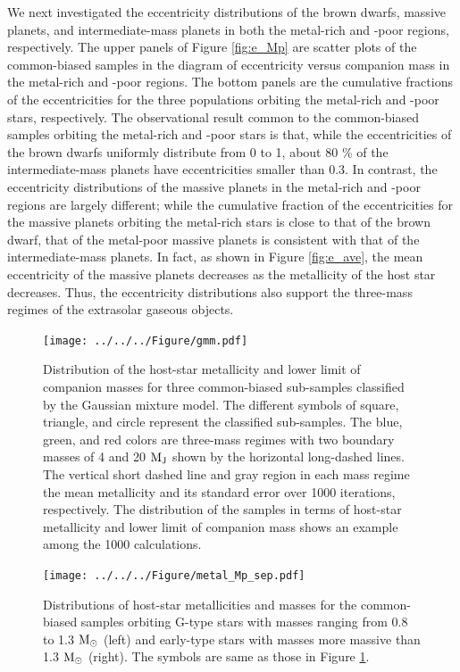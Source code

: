 \documentclass[twocolumn, dvipdfmx]{aastex62}
\begin{document}
\begin{CJK*}{UTF8}{min}
We next investigated the eccentricity distributions of the brown dwarfs, massive planets, and intermediate-mass planets in both the metal-rich and -poor regions, respectively. The upper panels of Figure \ref{fig:e_Mp} are scatter plots of the common-biased samples in the diagram of eccentricity versus companion mass in the metal-rich and -poor regions. The bottom panels are the cumulative fractions of the eccentricities for the three populations orbiting the metal-rich and -poor stars, respectively. The observational result common to the common-biased samples orbiting the metal-rich and -poor stars is that, while the eccentricities of the brown dwarfs uniformly distribute from 0 to 1, about 80 \% of the intermediate-mass planets have eccentricities smaller than 0.3. In contrast, the eccentricity distributions of the massive planets in the metal-rich and -poor regions are largely different; while the cumulative fraction of the eccentricities for the massive planets orbiting the metal-rich stars is close to that of the brown dwarf, that of the metal-poor massive planets is consistent with that of the intermediate-mass planets. In fact, as shown in Figure \ref{fig:e_ave}, the mean eccentricity of the massive planets decreases as the metallicity of the host star decreases. Thus, the eccentricity distributions also support the three-mass regimes of the extrasolar gaseous objects.

\begin{figure}[t]
\begin{center}
\texttt{[image: ../../../Figure/gmm.pdf]}
\caption{Distribution of the host-star metallicity and lower limit of companion masses for three common-biased sub-samples classified by the Gaussian mixture model. The different symbols of square, triangle, and circle represent the classified sub-samples. The blue, green, and red colors are three-mass regimes with two boundary masses of 4 and 20 $\rm M_J$ shown by the horizontal long-dashed lines. The vertical short dashed line and gray region in each mass regime the mean metallicity and its standard error over 1000 iterations, respectively. The distribution of the samples in terms of host-star metallicity and lower limit of companion mass shows an example among the 1000 calculations. \label{fig:gmm}}
\end{center}
\end{figure}

\begin{figure}[t]
\begin{center}
\texttt{[image: ../../../Figure/metal\_Mp\_sep.pdf]}
\caption{Distributions of host-star metallicities and masses for the common-biased samples orbiting G-type stars with masses ranging from 0.8 to 1.3 $\rm M_{\odot}$ (left) and early-type stars with masses more massive than 1.3 $\rm M_{\odot}$ (right). The symbols are same as those in Figure \ref{fig:gmm}. \label{fig:metal_Mp_sep}}
\end{center}
\end{figure}


\end{CJK*}
\end{document}

